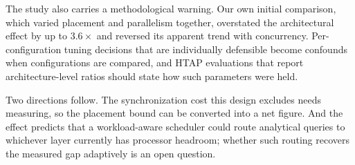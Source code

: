 \documentclass[conference,a4paper]{IEEEtran}
\begin{document}
The study also carries a methodological warning. Our own initial comparison,
which varied placement and parallelism together, overstated the architectural
effect by up to $3.6\times$ and reversed its apparent trend with concurrency.
Per-configuration tuning decisions that are individually defensible become
confounds when configurations are compared, and HTAP evaluations that report
architecture-level ratios should state how such parameters were held.

Two directions follow. The synchronization cost this design excludes needs
measuring, so the placement bound can be converted into a net figure. And the
effect predicts that a workload-aware scheduler could route analytical queries
to whichever layer currently has processor headroom; whether such routing
recovers the measured gap adaptively is an open question.
\end{document}
